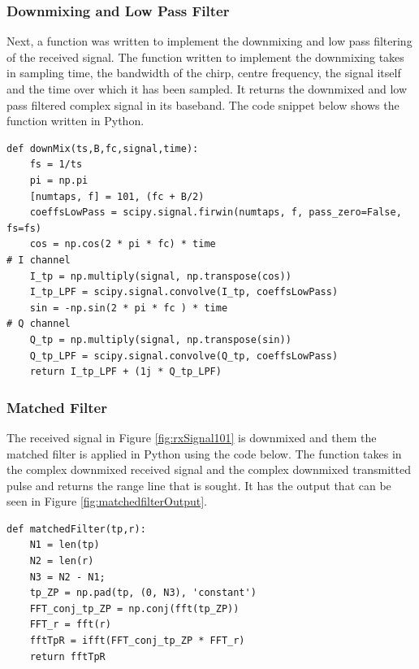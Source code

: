 \subsubsection{Downmixing and Low Pass Filter}
Next, a function was written to implement the downmixing and low pass filtering of the received signal. The function written to implement the downmixing takes in sampling time, the bandwidth of the chirp, centre frequency, the signal itself and the time over which it has been sampled. It returns the downmixed and low pass filtered complex signal in its baseband. The code snippet below shows the function written in Python.

{\small\begin{verbatim}
def downMix(ts,B,fc,signal,time):
    fs = 1/ts
    pi = np.pi
    [numtaps, f] = 101, (fc + B/2)
    coeffsLowPass = scipy.signal.firwin(numtaps, f, pass_zero=False, fs=fs)
    cos = np.cos(2 * pi * fc) * time                                                         # I channel
    I_tp = np.multiply(signal, np.transpose(cos))
    I_tp_LPF = scipy.signal.convolve(I_tp, coeffsLowPass)
    sin = -np.sin(2 * pi * fc ) * time                                                         # Q channel
    Q_tp = np.multiply(signal, np.transpose(sin))
    Q_tp_LPF = scipy.signal.convolve(Q_tp, coeffsLowPass)
    return I_tp_LPF + (1j * Q_tp_LPF)
\end{verbatim}}

\subsubsection{Matched Filter}

The received signal in Figure \ref{fig:rxSignal101} is downmixed and them the matched filter is applied in Python using the code below. The function takes in the complex downmixed received signal and the complex downmixed transmitted pulse and returns the range line that is sought. It has the output that can be seen in Figure \ref{fig:matchedfilterOutput}.

{\small\begin{verbatim}
def matchedFilter(tp,r):
    N1 = len(tp)
    N2 = len(r)
    N3 = N2 - N1; 
    tp_ZP = np.pad(tp, (0, N3), 'constant')
    FFT_conj_tp_ZP = np.conj(fft(tp_ZP))
    FFT_r = fft(r)
    fftTpR = ifft(FFT_conj_tp_ZP * FFT_r)
    return fftTpR
\end{verbatim}}

